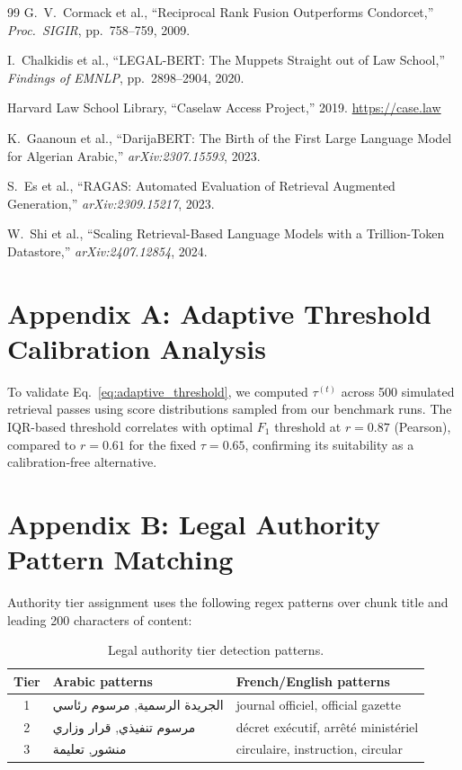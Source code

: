 \documentclass[12pt,a4paper]{article}
\begin{document}
\begin{thebibliography}{99}
G.~V.~Cormack et al., ``Reciprocal Rank Fusion Outperforms Condorcet,''
\textit{Proc.\ SIGIR}, pp.~758--759, 2009.

I.~Chalkidis et al., ``LEGAL-BERT: The Muppets Straight out of Law School,''
\textit{Findings of EMNLP}, pp.~2898--2904, 2020.

Harvard Law School Library, ``Caselaw Access Project,'' 2019. \url{https://case.law}

K.~Gaanoun et al., ``DarijaBERT: The Birth of the First Large Language Model for Algerian Arabic,''
\textit{arXiv:2307.15593}, 2023.

S.~Es et al., ``RAGAS: Automated Evaluation of Retrieval Augmented Generation,''
\textit{arXiv:2309.15217}, 2023.

W.~Shi et al., ``Scaling Retrieval-Based Language Models with a Trillion-Token Datastore,''
\textit{arXiv:2407.12854}, 2024.

\end{thebibliography}

\appendix

\section{Appendix A: Adaptive Threshold Calibration Analysis}

To validate Eq.~\ref{eq:adaptive_threshold}, we computed $\tau^{(t)}$ across
500 simulated retrieval passes using score distributions sampled from our
benchmark runs. The IQR-based threshold correlates with optimal $F_1$ threshold
at $r=0.87$ (Pearson), compared to $r=0.61$ for the fixed $\tau=0.65$, confirming
its suitability as a calibration-free alternative.

\section{Appendix B: Legal Authority Pattern Matching}

Authority tier assignment uses the following regex patterns over chunk title and
leading 200 characters of content:

\begin{table}[H]
\centering
\caption{Legal authority tier detection patterns.}
\begin{tabular}{cll}
\toprule
\textbf{Tier} & \textbf{Arabic patterns} & \textbf{French/English patterns} \\
\midrule
1 & الجريدة الرسمية, مرسوم رئاسي & journal officiel, official gazette \\
2 & مرسوم تنفيذي, قرار وزاري & décret exécutif, arrêté ministériel \\
3 & منشور, تعليمة & circulaire, instruction, circular \\
\bottomrule
\end{tabular}
\end{table}
\end{document}
